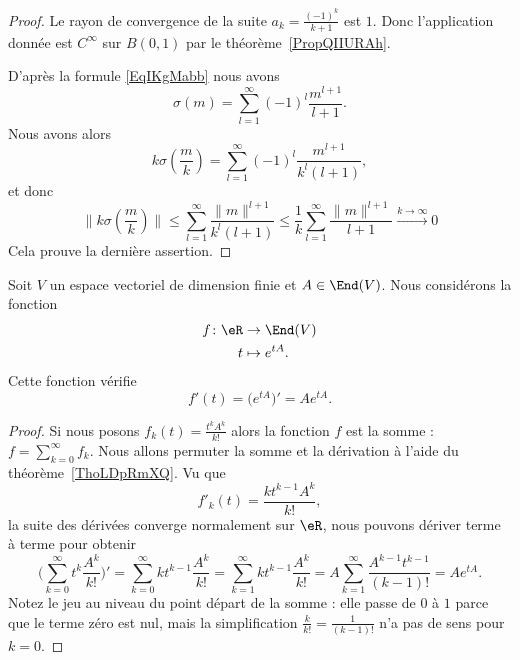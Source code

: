 \begin{proof}

	Le rayon de convergence de la suite \( a_k=\frac{ (-1)^k }{ k+1 }\) est \( 1\). Donc l'application donnée est \(  C^{\infty}\) sur \( B(0,1)\) par le théorème~\ref{PropQIIURAh}.

	D'après la formule \eqref{EqIKgMabb} nous avons
	\begin{equation}
		\sigma(m)=\sum_{l=1}^{\infty}(-1)^l\frac{ m^{l+1} }{ l+1 }.
	\end{equation}
	Nous avons alors
	\begin{equation}
		k\sigma(\frac{ m }{ k })=\sum_{l=1}^{\infty}(-1)^l\frac{ m^{l+1} }{ k^l(l+1) },
	\end{equation}
	et donc
	\begin{equation}
		\| k\sigma(\frac{ m }{ k }) \|\leq \sum_{l=1}^{\infty}\frac{ \| m \|^{l+1} }{ k^l(l+1) }\leq\frac{1}{ k }\sum_{l=1}^{\infty}\frac{ \| m \|^{l+1} }{ l+1 }\stackrel{k\to\infty}{\to} 0
	\end{equation}
	Cela prouve la dernière assertion.
\end{proof}

\begin{proposition}
	Soit \( V\) un espace vectoriel de dimension finie et \( A\in\End(V)\). Nous considérons la fonction
	\begin{equation}
		\begin{aligned}
			f\colon \eR & \to \End(V)      \\
			t           & \mapsto  e^{tA}.
		\end{aligned}
	\end{equation}
	Cette fonction vérifie
	\begin{equation}
		f'(t)=\big(  e^{tA} \big)'=A e^{tA}.
	\end{equation}
\end{proposition}

\begin{proof}
	Si nous posons \( f_k(t)=\frac{ t^kA^k }{ k! }\) alors la fonction \( f\) est la somme : \( f=\sum_{k=0}^{\infty}f_k\). Nous allons permuter la somme et la dérivation à l'aide du théorème~\ref{ThoLDpRmXQ}. Vu que
	\begin{equation}
		f'_k(t)=\frac{ kt^{k-1}A^k }{ k! },
	\end{equation}
	la suite des dérivées converge normalement sur \( \eR\), nous pouvons dériver terme à terme pour obtenir
	\begin{equation}
		\Big( \sum_{k=0}^{\infty}t^k\frac{ A^k }{ k! } \Big)'=\sum_{k=0}^{\infty}kt^{k-1}\frac{ A^k }{ k! }=\sum_{k=1}^{\infty}kt^{k-1}\frac{ A^k }{ k! }=A\sum_{k=1}^{\infty}\frac{ A^{k-1}t^{k-1} }{ (k-1)! }=A e^{tA}.
	\end{equation}
	Notez le jeu au niveau du point départ de la somme : elle passe de \( 0\) à \( 1\) parce que le terme zéro est nul, mais la simplification \( \frac{ k }{ k! }=\frac{ 1 }{ (k-1)! }\) n'a pas de sens pour \( k=0\).
\end{proof}

